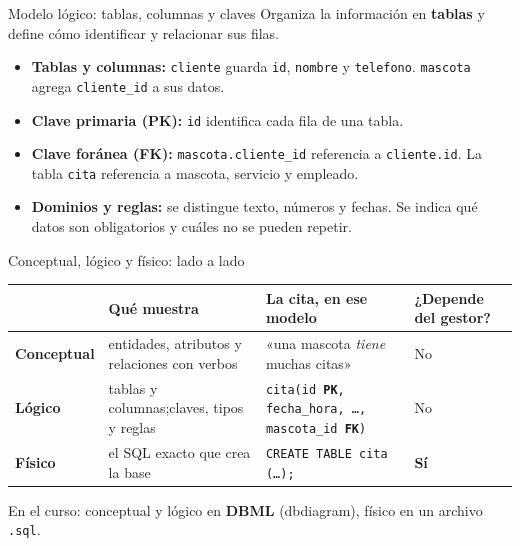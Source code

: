 \documentclass[aspectratio=169,10pt,c]{beamer}
\newcommand{\tbl}[1]{\textcolor{utpNaranja}{\texttt{#1}}}
\newcommand{\pk}{{\scriptsize\color{utpRojo}\textbf{PK}}}
\newcommand{\fk}{{\scriptsize\color{utpNaranja}\textbf{FK}}}
\begin{document}
\begin{frame}{Modelo lógico: tablas, columnas y claves}
\small Organiza la información en \textbf{tablas} y define cómo identificar y relacionar sus filas.
\vspace{0.2cm}
\begin{itemize}\setlength\itemsep{9pt}
  \item \textbf{Tablas y columnas:} \tbl{cliente} guarda \texttt{id}, \texttt{nombre} y \texttt{telefono}. \tbl{mascota} agrega \texttt{cliente\_id} a sus datos.
  \item \textbf{Clave primaria (PK):} \texttt{id} identifica cada fila de una tabla.
  \item \textbf{Clave foránea (FK):} \texttt{mascota.cliente\_id} referencia a \texttt{cliente.id}. La tabla \tbl{cita} referencia a mascota, servicio y empleado.
  \item \textbf{Dominios y reglas:} se distingue texto, números y fechas. Se indica qué datos son obligatorios y cuáles no se pueden repetir.
\end{itemize}
\vspace{0.2cm}
\end{frame}
\begin{frame}{Conceptual, lógico y físico: lado a lado}
\begin{center}
\small
\renewcommand{\arraystretch}{1.25}
\begin{tabular}{@{}>{\raggedright\bfseries}p{2.1cm}>{\raggedright\arraybackslash}p{4.3cm}>{\raggedright\arraybackslash}p{4.3cm}>{\centering\arraybackslash}p{1.8cm}@{}}
\toprule
& \bfseries Qué muestra & \bfseries La cita, en ese modelo & \bfseries ¿Depende del gestor? \\
\midrule
Conceptual & entidades, atributos y relaciones con verbos & «una mascota \textit{tiene} muchas citas» & No \\
Lógico & tablas y columnas;\newline claves, tipos y reglas & \texttt{cita(id \pk, fecha\_hora, \ldots, mascota\_id \fk)} & No \\
Físico & el SQL exacto que crea la base & \texttt{CREATE TABLE cita (\ldots);} & \textbf{Sí} \\
\bottomrule
\end{tabular}
\end{center}
\vspace{0.3cm}
\vspace{0.1cm}
\small En el curso: conceptual y lógico en \textbf{DBML} (dbdiagram), físico en un archivo \texttt{.sql}.
\end{frame}
\end{document}
